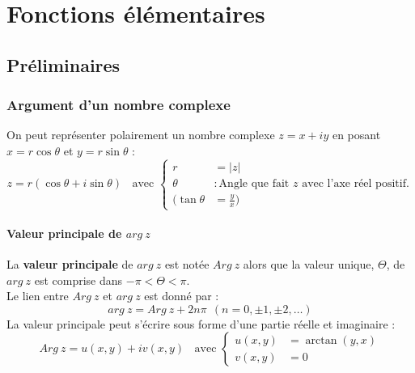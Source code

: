 
\chapter{Fonctions élémentaires}
\label{chap:2}
\section{Préliminaires}
\subsection{Argument d'un nombre complexe}
On peut représenter polairement un nombre complexe $z = x+iy$ en posant $x=r\cos\theta$ et $y =
r\sin\theta$ :
\begin{equation}
	z = r(\cos\theta + i\sin\theta)\ \ \ \ \text{avec }\left\{\begin{array}{ll}
	r &= |z| \\
	\theta &: \text{Angle que fait $z$ avec l'axe réel positif.}\\
	(\tan\theta &= \frac{y}{x})
	\end{array}\right.
\end{equation}
    
\subsubsection{Valeur principale de $arg\ z$}
La \textbf{valeur principale }de $arg\ z$ est notée $Arg\ z$ alors que la valeur unique,
$\Theta$, de $arg\ z$ est comprise dans $-\pi < \Theta <\pi$.\\ 
        
Le lien entre $Arg\ z$ et $arg\ z$ est donné par :
\begin{equation}
	arg\ z = Arg\ z + 2n\pi\ \ (n = 0,\pm 1, \pm 2, \dots)
\end{equation}
La valeur principale peut s'écrire sous forme d'une partie réelle et imaginaire :
\begin{equation}
	Arg\ z = u(x,y) + iv(x,y)\ \ \ \ \text{avec } \left\{\begin{array}{ll}
	u(x,y) &= \arctan(y,x)  \\
	v(x,y) &= 0 
	\end{array}\right.
\end{equation}
        
    
